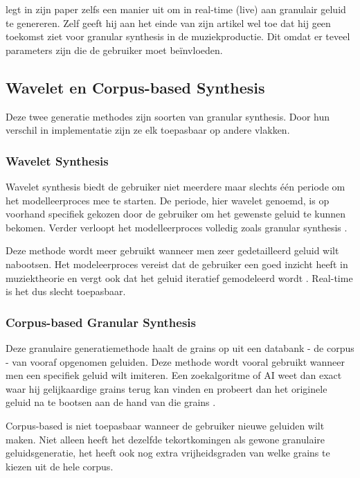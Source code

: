 \textcite{granular} legt in zijn paper zelfs een manier uit om in real-time (live) aan granulair geluid te genereren. Zelf geeft hij aan het einde van zijn artikel wel toe dat hij geen toekomst ziet voor granular synthesis in de muziekproductie. Dit omdat er teveel parameters zijn die de gebruiker moet beïnvloeden.

\subsection{Wavelet en Corpus-based Synthesis}

Deze twee generatie methodes zijn soorten van granular synthesis. Door hun verschil in implementatie zijn ze elk toepasbaar op andere vlakken.

\subsubsection{Wavelet Synthesis}

Wavelet synthesis biedt de gebruiker niet meerdere maar slechts één periode om het modelleerproces mee te starten. De periode, hier wavelet genoemd, is op voorhand specifiek gekozen door de gebruiker om het gewenste geluid te kunnen bekomen. Verder verloopt het modelleerproces volledig zoals granular synthesis \autocite{wavelet}.

Deze methode wordt meer gebruikt wanneer men zeer gedetailleerd geluid wilt nabootsen. Het modeleerproces vereist dat de gebruiker een goed inzicht heeft in muziektheorie en vergt ook dat het geluid iteratief gemodeleerd wordt 
\autocite{wavelet}. Real-time is het dus slecht toepasbaar.

\subsubsection{Corpus-based Granular Synthesis}

Deze granulaire generatiemethode haalt de grains op uit een databank - de corpus - van vooraf opgenomen geluiden. Deze methode wordt vooral gebruikt wanneer men een specifiek geluid wilt imiteren. Een zoekalgoritme of AI weet dan exact waar hij gelijkaardige grains terug kan vinden en probeert dan het originele geluid na te bootsen aan de hand van die grains 
\autocite{methodes}.

Corpus-based is niet toepasbaar wanneer de gebruiker nieuwe geluiden wilt maken. Niet alleen heeft het dezelfde tekortkomingen als gewone granulaire geluidsgeneratie, het heeft ook nog extra vrijheidsgraden van welke grains te kiezen uit de hele corpus.

